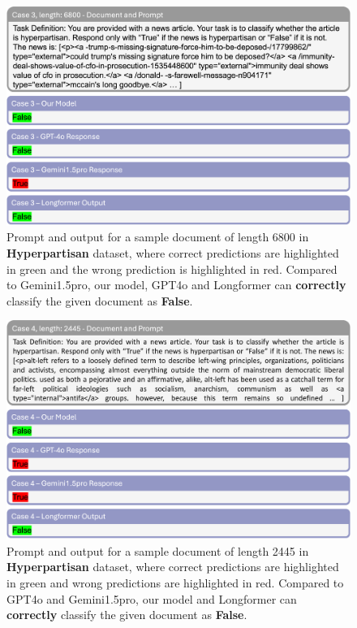 \documentclass[11pt]{article}
\begin{document}
\begin{figure}[!h]
    \vspace{-5pt}
    \centering
    \includegraphics[width=1.0\linewidth]{images/case3.png}
    \caption{Prompt and output for a sample document of length 6800 in \textbf{Hyperpartisan} dataset, where correct predictions are highlighted in green and the wrong prediction is highlighted in red. Compared to Gemini1.5pro, our model, GPT4o and Longformer can \textbf{correctly} classify the given document as \textbf{False}.}
    \label{fig:case3}
\end{figure}

\begin{figure}[!h]
    \centering
    \includegraphics[width=1.0\linewidth]{images/case4.png}
    \caption{Prompt and output for a sample document of length 2445 in \textbf{Hyperpartisan} dataset, where correct predictions are highlighted in green and wrong predictions are highlighted in red. Compared to GPT4o and Gemini1.5pro, our model and Longformer can \textbf{correctly} classify the given document as \textbf{False}.}
    \label{fig:case4}
\end{figure}
\end{document}

